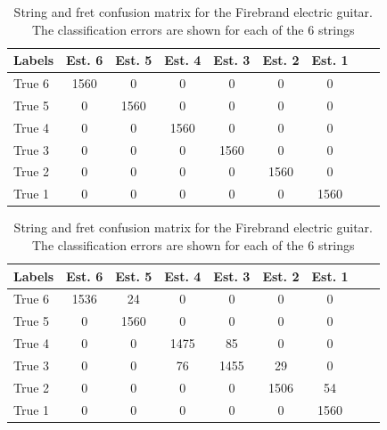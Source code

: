\documentclass{article}
\begin{document}
\begin{table}\centering %
\caption{String and fret confusion matrix for the Martin  acoustic guitar. The classification errors are shown for each of the 6 strings.}
\label{tbl:string_confusion_martin}
\begin{tabularx}{0.46\textwidth}{@{}l*{7}{c}c@{}}
\toprule
Labels &Est. 6   &Est. 5 &Est. 4   &Est. 3   &Est. 2   &Est. 1   \\ 
\midrule
True 6   &1560 \cellcolor[gray]{.8} &0  &0  &0  &0  &0  \\  
True 5   &0  & 1560\cellcolor[gray]{.8} & 0   &0  &0  &0  \\
True 4   &0  &0  &1560 \cellcolor[gray]{.8} &0  &0  &0  \\  
True 3   &0  &0  &0  &1560 \cellcolor[gray]{.8} &0  &0  \\  
True 2   &0  &0  &0  &0  &1560 \cellcolor[gray]{.8} &0  \\  
True 1   &0  &0  &0  &0  &0  &1560 \cellcolor[gray]{.8} \\  
\bottomrule
\end{tabularx}
%
\caption{String and fret confusion matrix for the Firebrand electric guitar. The classification errors are shown for each of the 6 strings}
\label{tbl:str_confusion_firebrand}
\begin{tabularx}{0.46\textwidth}{@{}l*{7}{c}c@{}}
\toprule
Labels &Est. 6   &Est. 5 &Est. 4   &Est. 3   &Est. 2   &Est. 1   \\ 
\midrule
True 6   &1536 \cellcolor[gray]{.8}       & 24                        &0      &0  &0  &0 \\
True 5   &0  & 1560\cellcolor[gray]{.8}   & 0                        &0      &0  &0  \\
True 4   &0  &0  &1475 \cellcolor[gray]{.8}                           & 85   &0  &0  \\
True 3   &0  &0  &76                     &1455 \cellcolor[gray]{.8}   & 29   &0  \\
True 2   &0  &0  &0  &0                   &1506 \cellcolor[gray]{.8}  & 54  \\
True 1   &0  &0  &0  &0                   &0                          &1560 \cellcolor[gray]{.8} \\
\bottomrule %
\end{tabularx}
\end{table}
\end{document}
